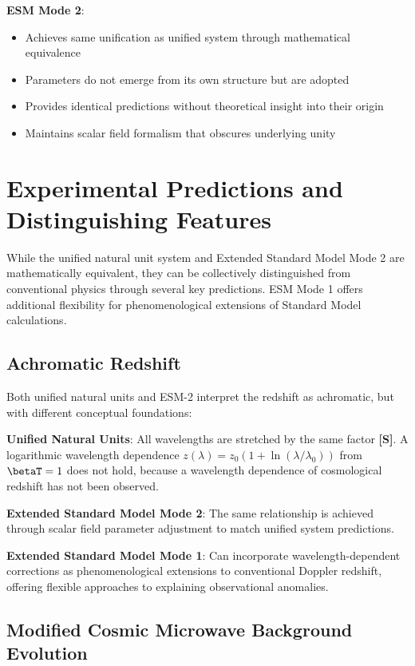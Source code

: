 	\textbf{ESM Mode 2}:
	\begin{itemize}
		\item Achieves same unification as unified system through mathematical equivalence
		\item Parameters do not emerge from its own structure but are adopted
		\item Provides identical predictions without theoretical insight into their origin
		\item Maintains scalar field formalism that obscures underlying unity
	\end{itemize}
	
	\section{Experimental Predictions and Distinguishing Features}
	\label{sec:experimental_predictions}
	
	While the unified natural unit system and Extended Standard Model Mode 2 are mathematically equivalent, they can be collectively distinguished from conventional physics through several key predictions. ESM Mode 1 offers additional flexibility for phenomenological extensions of Standard Model calculations.
	
	\subsection{Achromatic Redshift}
	\label{subsec:wavelength_dependent_redshift}
	
	Both unified natural units and ESM-2 interpret the redshift as achromatic, but with different conceptual foundations:
	
	\textbf{Unified Natural Units}: All wavelengths are stretched by the same factor \textbf{[S]}. A logarithmic wavelength dependence $z(\lambda) = z_0(1 + \ln(\lambda/\lambda_0))$ from $\betaT = 1$ does not hold, because a wavelength dependence of cosmological redshift has not been observed.
	
	\textbf{Extended Standard Model Mode 2}: The same relationship is achieved through scalar field parameter adjustment to match unified system predictions.
	
	\textbf{Extended Standard Model Mode 1}: Can incorporate wavelength-dependent corrections as phenomenological extensions to conventional Doppler redshift, offering flexible approaches to explaining observational anomalies.
	
	\subsection{Modified Cosmic Microwave Background Evolution}
	\label{subsec:cmb_evolution}
	
